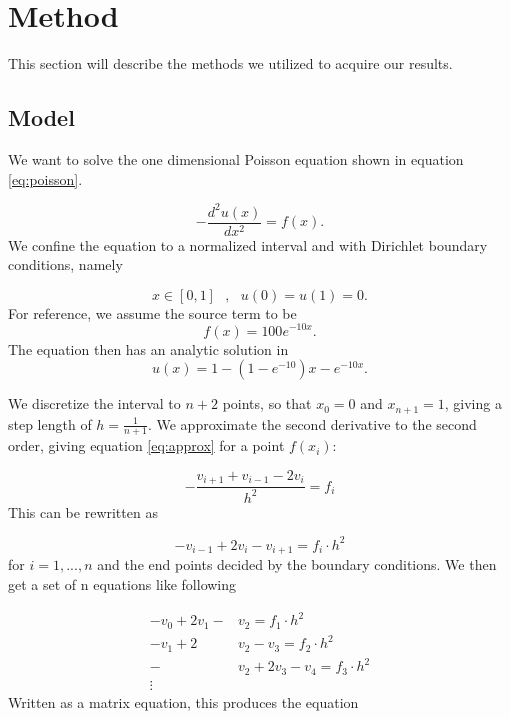 \documentclass{emulateapj}
\begin{document}
\section{Method}
\label{sec:method}
This section will describe the methods we utilized to acquire our results.
\subsection{Model}
We want to solve the one dimensional Poisson equation shown in equation \ref{eq:poisson}.

\begin{equation} \label{eq:poisson}
    -\frac{d^2u(x)}{dx^2} = f(x).
\end{equation}
We confine the equation to a normalized interval and with Dirichlet boundary conditions, namely

\begin{equation} \label{eq:conditions}
    x \in [0,1]\text{   } , \text{   } u(0) = u(1) = 0.
\end{equation}
For reference, we assume the source term to be
\begin{equation} \label{eq:fofx}
    f(x) = 100e^{-10x}.
\end{equation}
The equation then has an analytic solution in
\begin{equation} \label{eq:analytic}
    u(x) =1 - \left(1-e^{-10}\right)x - e^{-10x}. 
\end{equation}

We discretize the interval to $n+2$ points, so that $x_0 = 0$ and $x_{n+1} = 1$, giving a step length of $h = \frac{1}{n+1}$. We approximate the second derivative to the second order, giving equation \ref{eq:approx} for a point $f(x_i)$:

\begin{equation} \label{eq:approx}
    - \frac{v_{i+1} + v_{i-1} - 2v_{i}}{h^2} = f_i
\end{equation}
This can be rewritten as 

\begin{equation}
    -v_{i-1} + 2v_{i} - v_{i+1} = f_i \cdot h^2
\end{equation}
for $i=1,...,n$ and the end points decided by the boundary conditions. We then get a set of n equations like following

\begin{align*}
    - v_{0} + 2v_{1} - &v_{2} = f_1 \cdot h^2 \\
    - v_{1} + 2&v_{2} - v_{3} = f_2 \cdot h^2 \\
    - &v_{2} + 2v_{3} - v_{4} = f_3 \cdot h^2 \\
    \vdots
\end{align*}
Written as a matrix equation, this produces the equation
\end{document}
